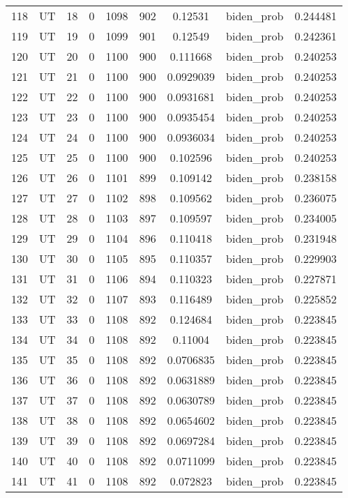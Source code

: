 \documentclass[12pt,a4paper]{article}
\begin{document}
\begin{tabular}{r|cccccccc}
	118 & UT & 18 & 0 & 1098 & 902 & 0.12531 & biden\_prob & 0.244481 \\
	119 & UT & 19 & 0 & 1099 & 901 & 0.12549 & biden\_prob & 0.242361 \\
	120 & UT & 20 & 0 & 1100 & 900 & 0.111668 & biden\_prob & 0.240253 \\
	121 & UT & 21 & 0 & 1100 & 900 & 0.0929039 & biden\_prob & 0.240253 \\
	122 & UT & 22 & 0 & 1100 & 900 & 0.0931681 & biden\_prob & 0.240253 \\
	123 & UT & 23 & 0 & 1100 & 900 & 0.0935454 & biden\_prob & 0.240253 \\
	124 & UT & 24 & 0 & 1100 & 900 & 0.0936034 & biden\_prob & 0.240253 \\
	125 & UT & 25 & 0 & 1100 & 900 & 0.102596 & biden\_prob & 0.240253 \\
	126 & UT & 26 & 0 & 1101 & 899 & 0.109142 & biden\_prob & 0.238158 \\
	127 & UT & 27 & 0 & 1102 & 898 & 0.109562 & biden\_prob & 0.236075 \\
	128 & UT & 28 & 0 & 1103 & 897 & 0.109597 & biden\_prob & 0.234005 \\
	129 & UT & 29 & 0 & 1104 & 896 & 0.110418 & biden\_prob & 0.231948 \\
	130 & UT & 30 & 0 & 1105 & 895 & 0.110357 & biden\_prob & 0.229903 \\
	131 & UT & 31 & 0 & 1106 & 894 & 0.110323 & biden\_prob & 0.227871 \\
	132 & UT & 32 & 0 & 1107 & 893 & 0.116489 & biden\_prob & 0.225852 \\
	133 & UT & 33 & 0 & 1108 & 892 & 0.124684 & biden\_prob & 0.223845 \\
	134 & UT & 34 & 0 & 1108 & 892 & 0.11004 & biden\_prob & 0.223845 \\
	135 & UT & 35 & 0 & 1108 & 892 & 0.0706835 & biden\_prob & 0.223845 \\
	136 & UT & 36 & 0 & 1108 & 892 & 0.0631889 & biden\_prob & 0.223845 \\
	137 & UT & 37 & 0 & 1108 & 892 & 0.0630789 & biden\_prob & 0.223845 \\
	138 & UT & 38 & 0 & 1108 & 892 & 0.0654602 & biden\_prob & 0.223845 \\
	139 & UT & 39 & 0 & 1108 & 892 & 0.0697284 & biden\_prob & 0.223845 \\
	140 & UT & 40 & 0 & 1108 & 892 & 0.0711099 & biden\_prob & 0.223845 \\
	141 & UT & 41 & 0 & 1108 & 892 & 0.072823 & biden\_prob & 0.223845 \\

\end{tabular}
\end{document}
